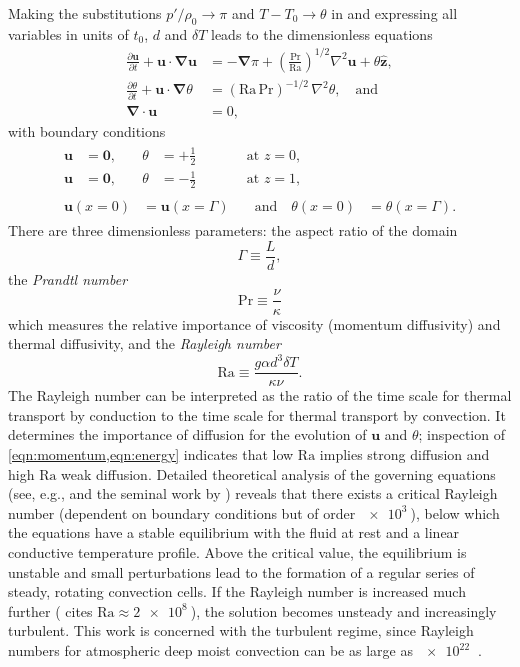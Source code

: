 \documentclass[titlepage,twoside]{article}
\numberwithin{equation}{section}
\newcommand{\pdiff}[2]{\frac{\partial #1}{\partial #2}}
\renewcommand\vec{\bm}
\newcommand{\uvec}[1]{\vec{\hat{#1}}}
\newcommand{\grad}{\vec{\nabla}}
\newcommand{\prandtl}{\ensuremath{\mathrm{Pr}}}
\newcommand{\rayleigh}{\ensuremath{\mathrm{Ra}}}
\begin{document}
Making the substitutions $p'/\rho_0 \to \pi$ and $T - T_0 \to \theta$
in  and expressing all
variables in units of $t_0$, $d$ and $\delta T$ leads to the dimensionless
equations
\begin{align}
    \label{eqn:momentum}
    \pdiff{\vec{u}}{t} + \vec{u} \cdot \grad \vec{u}
        &= -\grad \pi + \left( \frac{\prandtl}{\rayleigh}\right)^{1/2}
        \nabla^2 \vec{u} + \theta \uvec{z}, \\
    \label{eqn:energy}
    \pdiff{\theta}{t} + \vec{u} \cdot \grad \theta
        &= (\rayleigh\,\prandtl)^{-1/2} \, \nabla^2 \theta, \quad \text{and} \\
    \label{eqn:incompressible}
    \grad \cdot \vec{u} &= 0,
\end{align}
with boundary conditions
\begin{gather}
\begin{alignat}{3}
    \label{eqn:bc_bot}
    \vec{u} &= \vec{0}, &\quad \theta &= +\frac{1}{2}
    &\qquad& \text{at } z = 0, \\
    \label{eqn:bc_top}
    \vec{u} &= \vec{0}, &\quad \theta &= -\frac{1}{2}
    &\qquad& \text{at } z = 1,
\end{alignat} \\
\begin{alignat}{2}
    \label{eqn:bc_sides}
    \vec{u}(x=0) &= \vec{u}(x=\Gamma)
    &\quad \text{and} \quad \theta(x=0) &= \theta(x=\Gamma).
\end{alignat}
\end{gather}
There are three dimensionless parameters: the aspect ratio of the domain
\[
    \Gamma \equiv \frac{L}{d},
\]
the \emph{Prandtl number}
\[
    \prandtl \equiv \frac{\nu}{\kappa}
\]
which measures the relative importance of viscosity (momentum diffusivity)
and thermal diffusivity, and the \emph{Rayleigh number}
\[
    \rayleigh \equiv \frac{g \alpha d^3 \delta T}{\kappa \nu}.
\]
The Rayleigh number can be interpreted as the ratio of the time scale for
thermal transport by conduction to the time scale for
thermal transport by convection. It determines the importance of diffusion for the evolution of
$\vec{u}$ and $\theta$; inspection of \cref{eqn:momentum,eqn:energy} indicates
that low $\rayleigh$ implies strong diffusion and high $\rayleigh$ weak
diffusion. Detailed theoretical analysis of the governing equations (see, e.g.,
\textcite{chandrasekhar1961} and the seminal work by \textcite{rayleigh1916})
reveals that there exists a critical Rayleigh number (dependent on boundary
conditions but of order $\SI{e3}{}$), below which the equations have a stable
equilibrium with the fluid at rest and a linear conductive temperature profile.
Above the critical value, the equilibrium is unstable and small perturbations
lead to the formation of a regular series of steady, rotating convection cells.
If the Rayleigh number is increased much further (\textcite{le_quere1991} cites
$\rayleigh \approx \SI{2e8}{}$), the solution becomes unsteady and increasingly
turbulent. This work is concerned with the turbulent regime, since Rayleigh
numbers for atmospheric deep moist convection can be as large as $\SI{e22}{}$
\parencite{chilla2012}.
\end{document}

